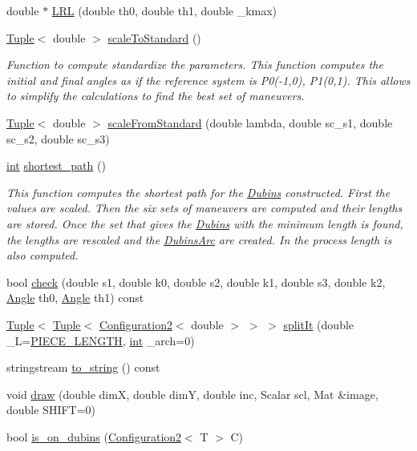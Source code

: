 \begin{DoxyCompactItemize}
double $\ast$ \mbox{\hyperlink{class_dubins_a1e1503925ef99b85b208f96fb27c88f9}{L\+RL}} (double th0, double th1, double \+\_\+kmax)
\item 
\mbox{\hyperlink{class_tuple}{Tuple}}$<$ double $>$ \mbox{\hyperlink{class_dubins_afecc4ffa89c5f3952b1729edb87ac88c}{scale\+To\+Standard}} ()
\begin{DoxyCompactList}\small\item\em Function to compute standardize the parameters. This function computes the initial and final angles as if the reference system is P0(-\/1,0), P1(0,1). This allows to simplify the calculations to find the best set of maneuvers. \end{DoxyCompactList}\item 
\mbox{\hyperlink{class_tuple}{Tuple}}$<$ double $>$ \mbox{\hyperlink{class_dubins_a5f4cd38e551fc0e2abdc360459454344}{scale\+From\+Standard}} (double lambda, double sc\+\_\+s1, double sc\+\_\+s2, double sc\+\_\+s3)
\item 
\mbox{\hyperlink{draw_8hh_aa620a13339ac3a1177c86edc549fda9b}{int}} \mbox{\hyperlink{class_dubins_a52681fe06e50899b5296204a312233ce}{shortest\+\_\+path}} ()
\begin{DoxyCompactList}\small\item\em This function computes the shortest path for the \mbox{\hyperlink{class_dubins}{Dubins}} constructed. First the values are scaled. Then the six sets of maneuvers are computed and their lengths are stored. Once the set that gives the \mbox{\hyperlink{class_dubins}{Dubins}} with the minimum length is found, the lengths are rescaled and the {\ttfamily \mbox{\hyperlink{class_dubins_arc}{Dubins\+Arc}}} are created. In the process length is also computed. \end{DoxyCompactList}\item 
bool \mbox{\hyperlink{class_dubins_ae016db7e7b4c450c0281792608205449}{check}} (double s1, double k0, double s2, double k1, double s3, double k2, \mbox{\hyperlink{class_angle}{Angle}} th0, \mbox{\hyperlink{class_angle}{Angle}} th1) const
\item 
\mbox{\hyperlink{class_tuple}{Tuple}}$<$ \mbox{\hyperlink{class_tuple}{Tuple}}$<$ \mbox{\hyperlink{class_configuration2}{Configuration2}}$<$ double $>$ $>$ $>$ \mbox{\hyperlink{class_dubins_a6ec6b08f50730585127d88f67dc31f18}{split\+It}} (double \+\_\+L=\mbox{\hyperlink{dubins_8hh_a5b2500ca93a5100f73dc442d3cfea7d4}{P\+I\+E\+C\+E\+\_\+\+L\+E\+N\+G\+TH}}, \mbox{\hyperlink{draw_8hh_aa620a13339ac3a1177c86edc549fda9b}{int}} \+\_\+arch=0)
\item 
stringstream \mbox{\hyperlink{class_dubins_a08abdf02352b6d47aafeea1eed9bfbfe}{to\+\_\+string}} () const
\item 
void \mbox{\hyperlink{class_dubins_a7de38680172155f68f71714ae13a212e}{draw}} (double dimX, double dimY, double inc, Scalar scl, Mat \&image, double S\+H\+I\+FT=0)
\item 
bool \mbox{\hyperlink{class_dubins_af8555d27092df352f0680da1d8057ee2}{is\+\_\+on\+\_\+dubins}} (\mbox{\hyperlink{class_configuration2}{Configuration2}}$<$ T $>$ C)
\end{DoxyCompactItemize}
